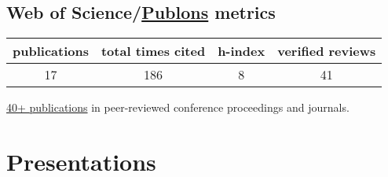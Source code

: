 \documentclass[a4paper,online,extended]{adcv}
\begin{document}
\subsection*{Web of Science/\href{https://publons.com/researcher/ABA-1884-2020/}{Publons} metrics}
\begin{tabular}{cccc}
 publications    & total times cited & h-index & verified reviews \\
\midrule
17 & 186 & 8 & 41
\end{tabular}
\vspace{-.3cm}
\ifextended
  \begin{refsection}
    \nocite{Albarelli2016a}
    \nocite{Rossi2016}
    \nocite{Albarelli2016}
    \nocite{Albarelli2017}
    \nocite{Albarelli2017a}
    \nocite{Albarelli2018}
    \nocite{Albarelli2018a}
    \nocite{Albarelli2018c}
    \nocite{Adnane2019}
    \nocite{Adnane2019a}
    \nocite{Albarelli2019a}
    \nocite{Albarelli2019}
    \nocite{Seveso2019}
    \nocite{Albarelli2019c}
    \nocite{Predko2020}
    \nocite{Tsang2019}
    \nocite{Rossi2020}
    \nocite{Gianani2020}
    \printbibliography[title={International peer-reviewed journals}, heading=subbibliography]
  \end{refsection}
\vspace{-.3cm}
  \begin{refsection}
    \nocite{Albarelli2019d}
    \nocite{Albarelli2018b}
    \printbibliography[title={Conference proceedings}, heading=subbibliography]
  \end{refsection}
\vspace{-.3cm}
  \begin{refsection}
    \nocite{Friel2020}
    \printbibliography[title={Preprints}, heading=subbibliography]
  \end{refsection}

\else
  \href{https://scholar.google.com/citations?user=s1bqnpoAAAAJ}{40+ publications} in peer-reviewed conference proceedings and journals.
\fi

\ifextended
  \section{Presentations}
  \vspace{-.3cm}
\end{document}
